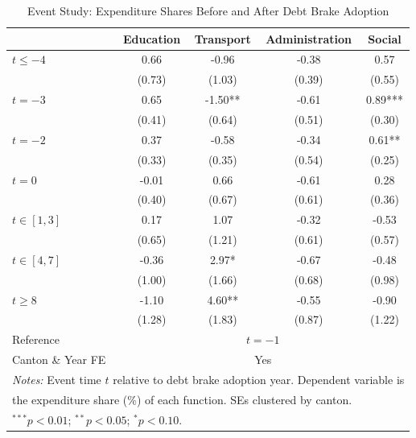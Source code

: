 \begin{table}[htbp]
\centering
\caption{Event Study: Expenditure Shares Before and After Debt Brake Adoption}
\label{tab:eventstudy}
\begin{tabular}{lcccc}
\hline\hline
 & Education & Transport & Administration & Social \\
\hline
$t \leq -4$ & 0.66 & -0.96 & -0.38 & 0.57 \\
 & (0.73) & (1.03) & (0.39) & (0.55) \\
$t = -3$ & 0.65 & -1.50** & -0.61 & 0.89*** \\
 & (0.41) & (0.64) & (0.51) & (0.30) \\
$t = -2$ & 0.37 & -0.58 & -0.34 & 0.61** \\
 & (0.33) & (0.35) & (0.54) & (0.25) \\
$t = 0$ & -0.01 & 0.66 & -0.61 & 0.28 \\
 & (0.40) & (0.67) & (0.61) & (0.36) \\
$t \in [1,3]$ & 0.17 & 1.07 & -0.32 & -0.53 \\
 & (0.65) & (1.21) & (0.61) & (0.57) \\
$t \in [4,7]$ & -0.36 & 2.97* & -0.67 & -0.48 \\
 & (1.00) & (1.66) & (0.68) & (0.98) \\
$t \geq 8$ & -1.10 & 4.60** & -0.55 & -0.90 \\
 & (1.28) & (1.83) & (0.87) & (1.22) \\
\hline
Reference & \multicolumn{4}{c}{$t = -1$} \\
Canton \& Year FE & \multicolumn{4}{c}{Yes} \\
\hline
\multicolumn{5}{l}{\footnotesize \textit{Notes:} Event time $t$ relative to debt brake adoption year. Dependent variable is} \\
\multicolumn{5}{l}{\footnotesize the expenditure share (\%) of each function. SEs clustered by canton.} \\
\multicolumn{5}{l}{\footnotesize $^{***}p<0.01$; $^{**}p<0.05$; $^{*}p<0.10$.} \\
\hline\hline
\end{tabular}
\end{table}
